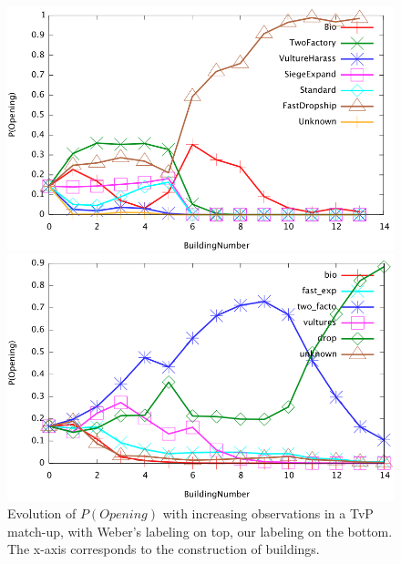 \begin{figure}[htp]
\centerline{\includegraphics[width=1.0\columnwidth]{images/TvP_prediction.png}}
\vspace{-0.2cm}
\centerline{\includegraphics[width=1.0\columnwidth]{images/TvPx_prediction.png}}
\vspace{-0.3cm}
\caption{Evolution of $P(Opening)$ with increasing observations in a TvP match-up, with Weber's labeling on top, our labeling on the bottom. The x-axis corresponds to the construction of buildings.}
\label{prediction}
\vspace{-0.5cm}
\end{figure}

